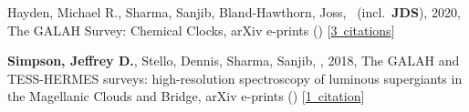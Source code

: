 \item[{\color{numcolor}\scriptsize2}] Hayden, Michael R., Sharma, Sanjib, Bland-Hawthorn, Joss, \etal\ (incl.\ \textbf{JDS}), 2020, The GALAH Survey: Chemical Clocks, arXiv e-prints () [\href{https://ui.adsabs.harvard.edu/#abs/2020arXiv201113745H}{3~citations}]

\item[{\color{numcolor}\scriptsize1}] \textbf{Simpson, Jeffrey D.}, Stello, Dennis, Sharma, Sanjib, \etal, 2018, The GALAH and TESS-HERMES surveys: high-resolution spectroscopy of luminous supergiants in the Magellanic Clouds and Bridge, arXiv e-prints () [\href{https://ui.adsabs.harvard.edu/#abs/2018arXiv180405900S}{1~citation}]